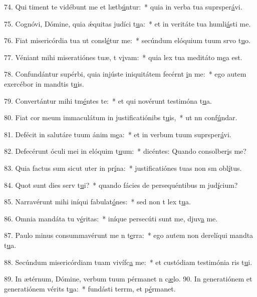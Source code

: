 74. Qui timent te vidébunt me et lætb\uline{ú}ntur:~* quia in verba tua suprsper\uline{á}vi.\par 
75. Cognóvi, Dómine, quia ǽquitas judíci t\uline{u}a:~* et in veritáte tua humli\uline{á}sti me.\par 
76. Fiat misericórdia tua ut consl\uline{é}tur me:~* secúndum elóquium tuum srvo t\uline{u}o.\par 
77. Véniant mihi miseratiónes tuæ, t v\uline{i}vam:~* quia lex tua meditáto m\uline{e}a est.\par 
78. Confundántur supérbi, quia injúste iniquitátem fecérnt \uline{i}n me:~* ego autem exercébor in mandtis t\uline{u}is.\par 
79. Convertántur mihi tm\uline{é}ntes te:~* et qui novérunt testimóna t\uline{u}a.\par 
80. Fiat cor meum immaculátum in justificatiónibs t\uline{u}is,~* ut nn conf\uline{ú}ndar.\par 
81. Defécit in salutáre tuum ánim m\uline{e}a:~* et in verbum tuum suprsper\uline{á}vi.\par 
82. Defecérunt óculi mei in elóquim t\uline{u}um:~* dicéntes: Quando consolber\uline{i}s me?\par 
83. Quia factus sum sicut uter in pr\uline{í}na:~* justificatiónes tuas non sm obl\uline{í}tus.\par 
84. Quot sunt dies serv t\uline{u}i?~* quando fácies de persequéntibus m jud\uline{í}cium?\par 
85. Narravérunt mihi iníqui fabulat\uline{ó}nes:~* sed non t lex t\uline{u}a.\par 
86. Omnia mandáta tu v\uline{é}ritas:~* iníque persecúti sunt me, djuv\uline{a} me.\par 
87. Paulo minus consummavérunt me n t\uline{e}rra:~* ego autem non derelíqui mandta t\uline{u}a.\par 
88. Secúndum misericórdiam tuam vivífc\uline{a} me:~* et custódiam testimónia ris t\uline{u}i.\par 
89. In ætérnum, Dómine, verbum tuum pérmanet n c\uline{æ}lo.
90. In generatiónem et generatiónem vérits t\uline{u}a:~* fundásti terrm, et p\uline{é}rmanet.\par 
